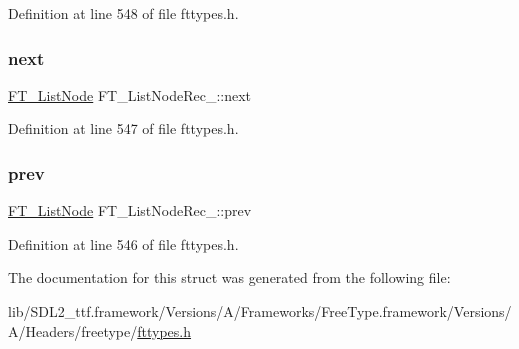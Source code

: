 Definition at line 548 of file fttypes.\+h.

\mbox{\label{struct_f_t___list_node_rec___a8275962fa8c92b77435cb4fa76251f39}} 
\subsubsection{\texorpdfstring{next}{next}}
{\footnotesize\ttfamily \mbox{\hyperlink{fttypes_8h_a155e4980a42c16fbc221ad40b2b59695}{F\+T\+\_\+\+List\+Node}} F\+T\+\_\+\+List\+Node\+Rec\+\_\+\+::next}



Definition at line 547 of file fttypes.\+h.

\mbox{\label{struct_f_t___list_node_rec___a41c77950e6940b1b98e04709b705c046}} 
\subsubsection{\texorpdfstring{prev}{prev}}
{\footnotesize\ttfamily \mbox{\hyperlink{fttypes_8h_a155e4980a42c16fbc221ad40b2b59695}{F\+T\+\_\+\+List\+Node}} F\+T\+\_\+\+List\+Node\+Rec\+\_\+\+::prev}



Definition at line 546 of file fttypes.\+h.



The documentation for this struct was generated from the following file\+:\begin{DoxyCompactItemize}
\item 
lib/\+S\+D\+L2\+\_\+ttf.\+framework/\+Versions/\+A/\+Frameworks/\+Free\+Type.\+framework/\+Versions/\+A/\+Headers/freetype/\mbox{\hyperlink{fttypes_8h}{fttypes.\+h}}\end{DoxyCompactItemize}
